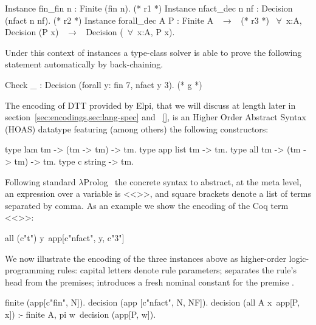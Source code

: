\documentclass[sigconf,natbib=false]{acmart}
\begin{document}
\begin{coqcode}
Instance fin_fin n : Finite (fin n).             (* r1 *)
Instance nfact_dec n nf : Decision (nfact n nf). (* r2 *)
Instance forall_dec A P : Finite A ~$\to$~            (* r3 *)
  ~$\forall$~x:A, Decision (P x) ~$\to$~ Decision (~$\forall$~x:A, P x).
\end{coqcode}

\noindent Under this context of instances a type-class solver is able to prove
the following statement automatically by back-chaining.

\begin{coqcode}
  Check _ : Decision (forall y: fin 7, nfact y 3).  (* g *)
\end{coqcode}

\noindent
The encoding of DTT provided by Elpi, that we will discuss at length later in
section~\ref{sec:encodings,sec:lang-spec} and ~\ref{}, is an Higher Order Abstract
Syntax (HOAS) datatype  featuring (among others) the following
constructors:

\begin{elpicode}
type lam  tm -> (tm -> tm) -> tm.     %
type app  list tm -> tm.              %
type all  tm -> (tm -> tm) -> tm.     %
type c    string -> tm.               %
\end{elpicode}

\noindent
Following standard $\lambda$Prolog~\cite{miller_nadathur_2012}
the concrete syntax to abstract, at the meta level, an expression
 over a variable 
is <<>>, and square brackets denote a list of
terms separated by comma. As an example we show the encoding of the Coq term
<<>>:

\begin{elpicode}
all (c"t") y\ app[c"nfact", y, c"3"]
\end{elpicode}

\noindent
We now illustrate the encoding of the three instances above as higher-order
logic-programming rules: capital letters denote rule
parameters; \elpiIn{:-} separates the rule's head from the premises;
 introduces a fresh nominal constant 
for the premise .

\begin{elpicode}
finite (app[c"fin", N]).                             %
decision (app [c"nfact", N, NF]).                    %
decision (all A x\ app[P, x]) :- finite A,           %
  pi w\ decision (app[P, w]).
\end{elpicode}
\end{document}
